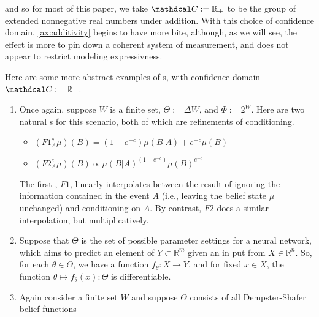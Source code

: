 \begin{phaseout}
and so for most of this paper, we take $\confdom := \Rplus$ to be the group of extended nonnegative real numbers under addition.
With this choice of confidence domain, \cref{ax:additivity} begins to have more bite, although, as we will see, the effect is more to pin down a coherent system of measurement, and does not appear to restrict modeling expressivness.
%
%


Here are some more abstract examples of \cofunc s, with confidence domain
$\confdom := \mathbb R_+$.
\begin{enumerate}
\item
Once again, suppose $W$ is a finite set,
$\Theta := \Delta W$, and $\Phi := 2^W$.
Here are two natural \cofunc s for this scenario, both of which are refinements of conditioning.
\begin{itemize}
	\item
	$\displaystyle
		(F1^c_A \mu)(B) = (1-e^{-c}) \mu(B|A) +  e^{-c} \mu(B)
	$
	\item
	$\displaystyle
		(F2^c_A \mu)(B) \propto \mu(B|A)^{(1-e^{-c})} \mu(B)^{e^{-c}}
	$
\end{itemize}
The first \cofunc, $F1$, linearly interpolates between the result of ignoring the information contained in the event $A$ (i.e., leaving the belief state $\mu$ unchanged) and conditioning on $A$.
By contrast, $F2$ does a similar interpolation, but multiplicatively.

\item
Suppose that $\Theta$ is the set of possible parameter settings for a neural network, which aims to predict an element of $Y \subset \mathbb R^{m}$ given an in put from $X \in \mathbb R^{n}$.
So, for each $\theta \in \Theta$, we have a function $f_\theta : X \to Y$, and for fixed $x \in X$, the function $\theta \mapsto f_\theta(x) : \Theta$ is differentiable.




\item
Again consider a finite set $W$ and suppose $\Theta$ consists of all Dempster-Shafer belief functions
\end{enumerate}




\end{phaseout}

